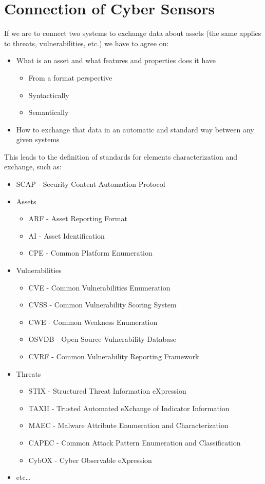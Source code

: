 \section{Connection of Cyber Sensors}
If we are to connect two systems to exchange data about assets (the same applies
to threats, vulnerabilities, etc.) we have to agree on:
\begin{itemize}
    \item What is an asset and what features and properties does it have
    \begin{itemize}
      \item From a format perspective
      \item Syntactically
      \item Semantically
   \end{itemize}
    \item How to exchange that data in an automatic and standard way between any given systems
\end{itemize}

This leads to the definition of standards for elements characterization and exchange, such as:
\begin{itemize}
   \item SCAP - Security Content Automation Protocol
   \item Assets
   \begin{itemize}
      \item ARF - Asset Reporting Format
      \item AI - Asset Identification
      \item CPE - Common Platform Enumeration 
   \end{itemize}
   
   \item Vulnerabilities
   \begin{itemize}
      \item CVE - Common Vulnerabilities Enumeration
      \item CVSS - Common Vulnerability Scoring System
      \item CWE - Common Weakness Enumeration
      \item OSVDB - Open Source Vulnerability Database
      \item CVRF - Common Vulnerability Reporting Framework
   \end{itemize}
   \item Threats
   \begin{itemize}
   	\item STIX - Structured Threat Information eXpression
	   \item TAXII  - Trusted Automated eXchange of Indicator Information
	   \item MAEC - Malware Attribute Enumeration and Characterization
	   \item CAPEC - Common Attack Pattern Enumeration and Classification
	   \item CybOX - Cyber Observable eXpression
   \end{itemize}
   \item etc\dots
\end{itemize}

